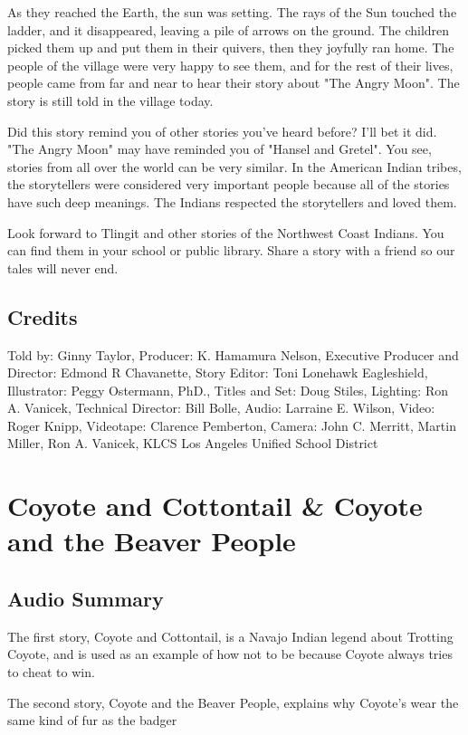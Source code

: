 As they reached the Earth, the sun was setting. The rays of the Sun touched the ladder, and it disappeared, leaving a pile of arrows on the ground. The children picked them up and put them in their quivers, then they joyfully ran home. The people of the village were very happy to see them, and for the rest of their lives, people came from far and near to hear their story about "The Angry Moon". The story is still told in the village today.

Did this story remind you of other stories you've heard before? I'll bet it did. "The Angry Moon" may have reminded you of "Hansel and Gretel". You see, stories from all over the world can be very similar. In the American Indian tribes, the storytellers were considered very important people because all of the stories have such deep meanings. The Indians respected the storytellers and loved them.

Look forward to Tlingit and other stories of the Northwest Coast Indians. You can find them in your school or public library. Share a story with a friend so our tales will never end.

\subsection{Credits}

Told by: Ginny Taylor,
Producer: K. Hamamura Nelson,
Executive Producer and Director: Edmond R Chavanette,
Story Editor: Toni Lonehawk Eagleshield,
Illustrator: Peggy Ostermann, PhD.,
Titles and Set: Doug Stiles,
Lighting: Ron A. Vanicek,
Technical Director: Bill Bolle,
Audio: Larraine E. Wilson,
Video: Roger Knipp,
Videotape: Clarence Pemberton,
Camera: John C. Merritt, Martin Miller, Ron A. Vanicek,
KLCS Los Angeles Unified School District

\section{Coyote and Cottontail \& Coyote and the Beaver People}

\subsection{Audio Summary}

The first story, Coyote and Cottontail, is a Navajo Indian legend about Trotting Coyote, and is used as an example of how not to be because Coyote always tries to cheat to win.

The second story, Coyote and the Beaver People, explains why Coyote's wear the same kind of fur as the badger

